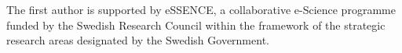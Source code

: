 \documentclass[runningheads]{llncs}
\begin{document}
The first author is supported by eSSENCE, a collaborative e-Science programme funded by the Swedish Research Council within the framework of the strategic research areas designated by the Swedish Government.


%
%
%


 
\end{document}
